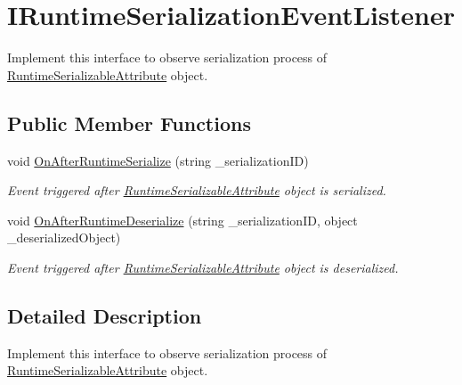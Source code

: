 \hypertarget{interface_voxel_busters_1_1_runtime_serialization_1_1_i_runtime_serialization_event_listener}{}\section{I\+Runtime\+Serialization\+Event\+Listener}
\label{interface_voxel_busters_1_1_runtime_serialization_1_1_i_runtime_serialization_event_listener}


Implement this interface to observe serialization process of \hyperlink{class_voxel_busters_1_1_runtime_serialization_1_1_runtime_serializable_attribute}{Runtime\+Serializable\+Attribute} object.  


\subsection*{Public Member Functions}
\begin{DoxyCompactItemize}
\item 
void \hyperlink{interface_voxel_busters_1_1_runtime_serialization_1_1_i_runtime_serialization_event_listener_abfb7c64c92db39873b146329d65b28d3}{On\+After\+Runtime\+Serialize} (string \+\_\+serialization\+I\+D)
\begin{DoxyCompactList}\small\item\em Event triggered after \hyperlink{class_voxel_busters_1_1_runtime_serialization_1_1_runtime_serializable_attribute}{Runtime\+Serializable\+Attribute} object is serialized. \end{DoxyCompactList}\item 
void \hyperlink{interface_voxel_busters_1_1_runtime_serialization_1_1_i_runtime_serialization_event_listener_a173869901c67a8165ae0c3bb05e35502}{On\+After\+Runtime\+Deserialize} (string \+\_\+serialization\+I\+D, object \+\_\+deserialized\+Object)
\begin{DoxyCompactList}\small\item\em Event triggered after \hyperlink{class_voxel_busters_1_1_runtime_serialization_1_1_runtime_serializable_attribute}{Runtime\+Serializable\+Attribute} object is deserialized. \end{DoxyCompactList}\end{DoxyCompactItemize}


\subsection{Detailed Description}
Implement this interface to observe serialization process of \hyperlink{class_voxel_busters_1_1_runtime_serialization_1_1_runtime_serializable_attribute}{Runtime\+Serializable\+Attribute} object. 



